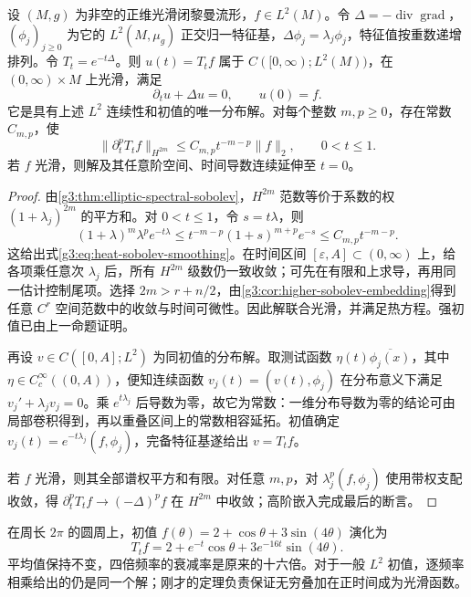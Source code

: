 \begin{theorem}\label{g3:thm:heat-spectral-solution}
	设 \((M,g)\) 为非空的正维光滑闭黎曼流形，\(f\in L^2(M)\)。令 \(\Delta=-\operatorname{div}\operatorname{grad}\)，\((\phi_j)_{j\ge0}\) 为它的 \(L^2(M,\mu_g)\) 正交归一特征基，\(\Delta\phi_j=\lambda_j\phi_j\)，特征值按重数递增排列。令 \(T_t=e^{-t\Delta}\)。则 \(u(t)=T_tf\) 属于 \(C([0,\infty);L^2(M))\)，在 \((0,\infty)\times M\) 上光滑，满足
	\[
		\partial_tu+\Delta u=0,\qquad u(0)=f.
	\]
	它是具有上述 \(L^2\) 连续性和初值的唯一分布解。对每个整数 \(m,p\ge0\)，存在常数 \(C_{m,p}\)，使
	\begin{equation}\label{g3:eq:heat-sobolev-smoothing}
		\|\partial_t^pT_tf\|_{H^{2m}}
		\le C_{m,p}t^{-m-p}\|f\|_2,
		\qquad 0<t\le1.
	\end{equation}
	若 \(f\) 光滑，则解及其任意阶空间、时间导数连续延伸至 \(t=0\)。
\end{theorem}
\begin{proof}
	由\cref{g3:thm:elliptic-spectral-sobolev}，\(H^{2m}\) 范数等价于系数的权 \((1+\lambda_j)^{2m}\) 的平方和。对 \(0<t\le1\)，令 \(s=t\lambda\)，则
	\[
		(1+\lambda)^m\lambda^p e^{-t\lambda}
		\le t^{-m-p}(1+s)^{m+p}e^{-s}
		\le C_{m,p}t^{-m-p}.
	\]
	这给出式\eqref{g3:eq:heat-sobolev-smoothing}。在时间区间 \([\varepsilon,A]\subset(0,\infty)\) 上，给各项乘任意次 \(\lambda_j\) 后，所有 \(H^{2m}\) 级数仍一致收敛；可先在有限和上求导，再用同一估计控制尾项。选择 \(2m>r+n/2\)，由\cref{g3:cor:higher-sobolev-embedding}得到任意 \(C^r\) 空间范数中的收敛与时间可微性。因此解联合光滑，并满足热方程。强初值已由上一命题证明。

	再设 \(v\in C([0,A];L^2)\) 为同初值的分布解。取测试函数 \(\eta(t)\overline{\phi_j(x)}\)，其中 \(\eta\in C_c^\infty((0,A))\)，便知连续函数 \(v_j(t)=(v(t),\phi_j)\) 在分布意义下满足
	\(v_j'+\lambda_jv_j=0\)。乘 \(e^{t\lambda_j}\) 后导数为零，故它为常数：一维分布导数为零的结论可由局部卷积得到，再以重叠区间上的常数相容延拓。初值确定 \(v_j(t)=e^{-t\lambda_j}(f,\phi_j)\)，完备特征基遂给出 \(v=T_tf\)。

	若 \(f\) 光滑，则其全部谱权平方和有限。对任意 \(m,p\)，对 \(\lambda_j^p(f,\phi_j)\) 使用带权支配收敛，得 \(\partial_t^pT_tf\to(-\Delta)^pf\) 在 \(H^{2m}\) 中收敛；高阶嵌入完成最后的断言。
\end{proof}

\begin{example}\label{g3:exm:circle-heat-decay}
	在周长 \(2\pi\) 的圆周上，初值 \(f(\theta)=2+\cos\theta+3\sin(4\theta)\) 演化为
	\[
		T_tf=2+e^{-t}\cos\theta+3e^{-16t}\sin(4\theta).
	\]
	平均值保持不变，四倍频率的衰减率是原来的十六倍。对于一般 \(L^2\) 初值，逐频率相乘给出的仍是同一个解；刚才的定理负责保证无穷叠加在正时间成为光滑函数。
\end{example}

